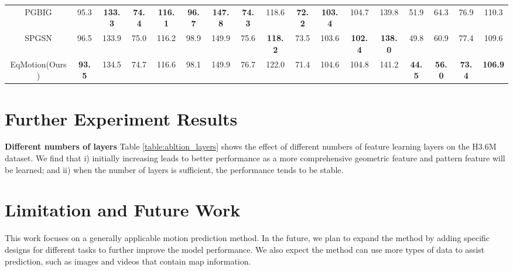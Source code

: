 \documentclass[10pt,twocolumn,letterpaper]{article}
\begin{document}
\begin{table*}[ht]
{\begin{tabular}{c|cc|cc|cc|cc|cc|cc|cc|cc}
PGBIG                &  {95.3} &   \textbf{133.3} &   \textbf{74.4} &   \textbf{116.1} &    \textbf{96.7}  &   \textbf{147.8} &   \textbf{74.3}  &   {118.6} &   \textbf{72.2} &   \textbf{103.4} &   {104.7} &   {139.8} &   {51.9}    &   {64.3}    &   {76.9}  &   {110.3} \\ 
SPGSN& 96.5& 133.9& 75.0& 116.2& 98.9& 149.9& 75.6& \textbf{118.2}& 73.5& 103.6& \textbf{102.4}& \textbf{138.0}& 49.8& 60.9& 77.4& 109.6\\
EqMotion(Ours) &\textbf{93.5}&134.5&74.7&116.6&{98.1}&{149.9}&76.7&122.0&71.4&104.6&104.8&141.2&\textbf{44.5}&\textbf{56.0}&\textbf{73.4}&\textbf{106.9}\\\hline

\end{tabular} 
}
\label{tab:supp_Human3.6long-term}
\end{table*}

\section{Further Experiment Results}


\noindent\textbf{Different numbers of layers}
Table \ref{table:abltion_layers} shows the effect of different numbers of feature learning layers  on the H3.6M dataset. We find that i) initially increasing  leads to better performance as a more comprehensive geometric feature and pattern feature will be learned; and ii) when the number of layers is sufficient, the performance tends to be stable. 




\section{Limitation and Future Work}
This work focuses on a generally applicable motion prediction method. In the future, we plan to expand the method by adding specific designs for different tasks to further improve the model performance. We also expect the method can use more types of data to assist prediction, such as images and videos that contain map information.
\end{document}

